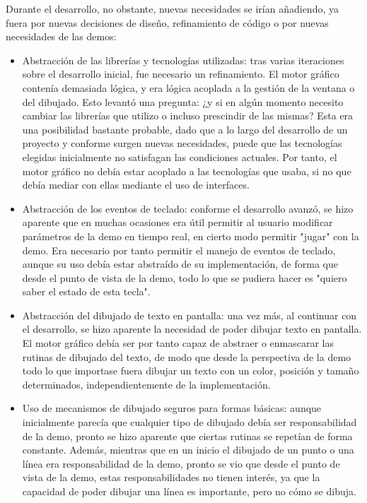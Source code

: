 Durante el desarrollo, no obstante, nuevas necesidades se irían añadiendo, ya fuera por nuevas decisiones de diseño, refinamiento de código o por nuevas necesidades de las demos:
\begin{itemize}
	\item Abstracción de las librerías y tecnologías utilizadas: tras varias iteraciones sobre el desarrollo inicial, fue necesario un refinamiento. El motor gráfico contenía demasiada lógica, y era lógica acoplada a la gestión de la ventana o del dibujado. Esto levantó una pregunta: ¿y si en algún momento necesito cambiar las librerías que utilizo o incluso prescindir de las mismas? Esta era una posibilidad bastante probable, dado que a lo largo del desarrollo de un proyecto y conforme surgen nuevas necesidades, puede que las tecnologías elegidas inicialmente no satisfagan las condiciones actuales. Por tanto, el motor gráfico no debía estar acoplado a las tecnologías que usaba, si no que debía mediar con ellas mediante el uso de interfaces.
	\item Abstracción de los eventos de teclado: conforme el desarrollo avanzó, se hizo aparente que en muchas ocasiones era útil permitir al usuario modificar parámetros de la demo en tiempo real, en cierto modo permitir "jugar" con la demo. Era necesario por tanto permitir el manejo de eventos de teclado, aunque su uso debía estar abstraído de su implementación, de forma que desde el punto de vista de la demo, todo lo que se pudiera hacer es "quiero saber el estado de esta tecla".
	\item Abstracción del dibujado de texto en pantalla: una vez más, al continuar con el desarrollo, se hizo aparente la necesidad de poder dibujar texto en pantalla. El motor gráfico debía ser por tanto capaz de abstraer o enmascarar las rutinas de dibujado del texto, de modo que desde la perspectiva de la demo todo lo que importase fuera dibujar un texto con un color, posición y tamaño determinados, independientemente de la implementación.
	\item Uso de mecanismos de dibujado seguros para formas básicas: aunque inicialmente parecía que cualquier tipo de dibujado debía ser responsabilidad de la demo, pronto se hizo aparente que ciertas rutinas se repetían de forma constante. Además, mientras que en un inicio el dibujado de un punto o una línea era responsabilidad de la demo, pronto se vio que desde el punto de vista de la demo, estas responsabilidades no tienen interés, ya que la capacidad de poder dibujar una línea es importante, pero no cómo se dibuja. 
		\begin{itemize}

\end{itemize}
\end{itemize}
